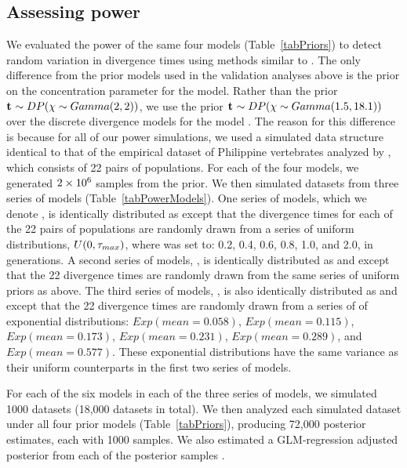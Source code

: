 \subsection*{Assessing power}
We evaluated the power of the same four models (Table~\ref{tabPriors}) to
detect random variation in divergence times using methods similar to
\citet{Oaks2012}.
The only difference from the prior models used in the validation analyses above
is the prior on the concentration parameter \concentrationParam for the
\modelDPP model.
Rather than the prior
$\mathbf{t_{}} \sim DP(\chi \sim Gamma(2,2))$,
we use the prior
$\mathbf{t_{}} \sim DP(\chi \sim Gamma(1.5,18.1))$
over the discrete divergence models for the model \modelDPP.
The reason for this difference is because for all of our power simulations, we
used a simulated data structure identical to that of the empirical dataset of
Philippine vertebrates analyzed by \citet{Oaks2012}, which consists of 22 pairs
of populations.
For each of the four models, we generated $2\times 10^{6}$ samples from the prior.
We then simulated datasets from three series of models
(Table~\ref{tabPowerModels}).
One series of models, which we denote \powerSeriesOld, is identically
distributed as \modelOld except that the divergence times for each of the 22
pairs of populations are randomly drawn from a series of uniform distributions,
$U(0, \tau_{max})$, where  was set to: 0.2, 0.4, 0.6, 0.8, 1.0, and
2.0, in \globalcoalunit generations.
A second series of models, \powerSeriesUniform, is identically distributed as
\modelUniform and \modelDPP except that the 22 divergence times are randomly
drawn from the same series of uniform priors as above.
The third series of models, \powerSeriesExp, is also identically distributed as
\modelUniform and \modelDPP except that the 22 divergence times are randomly
drawn from a series of of exponential distributions:
$Exp(mean=0.058)$, $Exp(mean=0.115)$, $Exp(mean=0.173)$, $Exp(mean=0.231)$,
$Exp(mean=0.289)$, and $Exp(mean=0.577)$.
These exponential distributions have the same variance as their uniform
counterparts in the first two series of models.

For each of the six models in each of the three series of models, we simulated
1000 datasets (18,000 datasets in total).
We then analyzed each simulated dataset under all four prior models
(Table~\ref{tabPriors}), producing 72,000 posterior estimates, each with 1000
samples.
We also estimated a GLM-regression adjusted posterior from each of the
posterior samples \citep{Leuenberger2010}.


